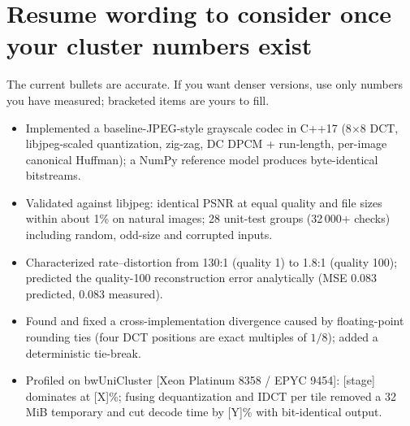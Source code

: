 \section{Resume wording to consider once your cluster numbers exist}

The current bullets are accurate. If you want denser versions, use only numbers you have measured; bracketed items are yours to fill.

\begin{itemize}
\item Implemented a baseline-JPEG-style grayscale codec in C++17 (8$\times$8 DCT, libjpeg-scaled quantization, zig-zag, DC DPCM + run-length, per-image canonical Huffman); a NumPy reference model produces byte-identical bitstreams.
\item Validated against libjpeg: identical PSNR at equal quality and file sizes within about 1\% on natural images; 28 unit-test groups (32\,000+ checks) including random, odd-size and corrupted inputs.
\item Characterized rate--distortion from 130:1 (quality 1) to 1.8:1 (quality 100); predicted the quality-100 reconstruction error analytically (MSE 0.083 predicted, 0.083 measured).
\item Found and fixed a cross-implementation divergence caused by floating-point rounding ties (four DCT positions are exact multiples of $1/8$); added a deterministic tie-break.
\item Profiled on bwUniCluster [Xeon Platinum 8358 / EPYC 9454]: [stage] dominates at [X]\%; fusing dequantization and IDCT per tile removed a 32\,MiB temporary and cut decode time by [Y]\% with bit-identical output.
\end{itemize}
